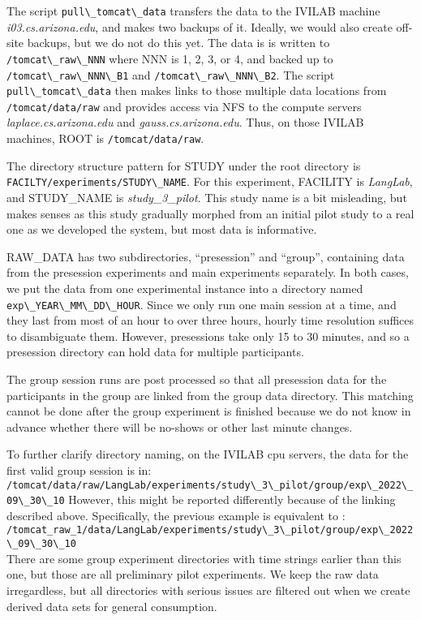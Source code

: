 \documentclass[12pt,letterpaper,oneside,openany]{article}
\newcommand{\code}[1]{\lstinline{#1}}
\begin{document}
The script \code{pull\_tomcat\_data} transfers the data to the IVILAB machine
\textit{i03.cs.arizona.edu}, and makes two backups of it.  Ideally, we would
also create off-site backups, but we do not do this yet. The data is is
written to
\code{/tomcat\_raw\_NNN} where NNN is 1, 2, 3, or 4, and backed up to 
\code{/tomcat\_raw\_NNN\_B1} and \code{/tomcat\_raw\_NNN\_B2}.  
The script \code{pull\_tomcat\_data} then makes links to those multiple data
locations from \code{/tomcat/data/raw} and provides access via NFS to the compute
servers \textit{laplace.cs.arizona.edu} and \textit{gauss.cs.arizona.edu}.
Thus, on those IVILAB machines, ROOT is \code{/tomcat/data/raw}.

The directory structure pattern for STUDY under the root directory is
\code{FACILTY/experiments/STUDY\_NAME}. For this experiment, FACILITY is
\textit{LangLab}, and STUDY\_NAME is \textit{study\_3\_pilot}.
This study name is a bit misleading, but makes senses as this study
gradually morphed from an initial pilot study to a real one as we developed the
system, but most data is informative. 

RAW\_DATA has two subdirectories, ``presession'' and ``group'', containing data
from the presession experiments and main experiments separately. In both cases, we put the
data from one experimental instance into a directory named
\code{exp\_YEAR\_MM\_DD\_HOUR}. Since we only run one main session at a time, and
they last from most of an hour to over three hours, hourly time resolution
suffices to disambiguate them. However, presessions take only 15 to 30 minutes,
and so a presession directory can hold data for multiple participants. 

The group session runs are post processed so that all presession data for the
participants in the group are linked from the group data directory. This
matching cannot be done after the group experiment is finished because we do not
know in advance whether there will be no-shows or other last minute changes. 

To further clarify directory naming, on the IVILAB cpu servers,
the data for the first valid group session 
is in:\\
\code{/tomcat/data/raw/LangLab/experiments/study\_3\_pilot/group/exp\_2022\_09\_30\_10}
However, this might be reported  differently because of the linking described
above. Specifically, the previous example is equivalent to :\\
\code{/tomcat_raw_1/data/LangLab/experiments/study\_3\_pilot/group/exp\_2022\_09\_30\_10}\\
There are some group experiment directories with time strings earlier than this
one, but those are all preliminary pilot experiments. We keep the raw data
irregardless, but all directories with serious issues are filtered out when we
create derived data sets for general consumption.
\end{document}
